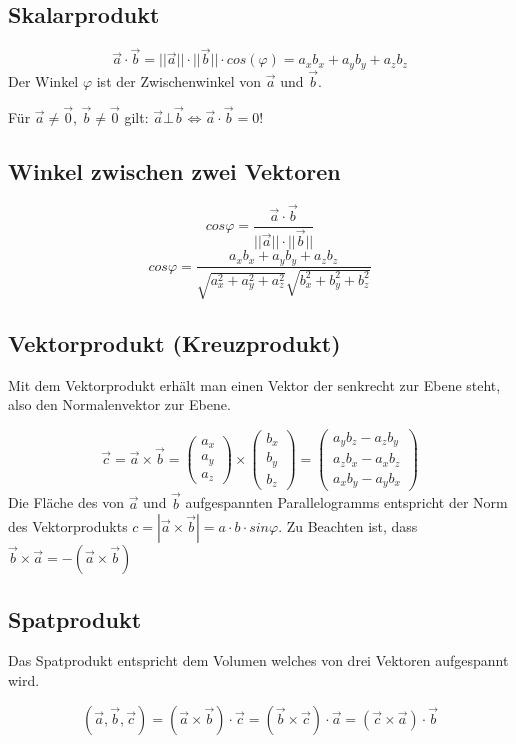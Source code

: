 \subsection{Skalarprodukt}
\[ \boxed{ \vec{a} \cdot \vec{b} = ||\vec{a}|| \cdot ||\vec{b}|| 
\cdot cos(\varphi) = a_x b_x + a_y b_y + a_z b_z } \]
Der Winkel $\varphi$ ist der Zwischenwinkel von $\vec{a}$ und $\vec{b}$.

\noindent
Für $\vec{a} \neq \vec{0}$, $\vec{b} \neq \vec{0}$ gilt: $\vec{a} \bot \vec{b} 
\Leftrightarrow \vec{a} \cdot \vec{b} = 0$!

\subsection{Winkel zwischen zwei Vektoren}
\[ \boxed{ cos \varphi = \frac{\vec{a} \cdot \vec{b} }
{||\vec{a}|| \cdot ||\vec{b}||} } \]
\[ \boxed{ cos \varphi = \frac{a_x b_x + a_y b_y + a_z b_z}
{ \sqrt{a_x^2 + a_y^2 + a_z^2} \sqrt{b_x^2 + b_y^2 + b_z^2} } } \]

\subsection{Vektorprodukt (Kreuzprodukt)}
Mit dem Vektorprodukt erhält man einen Vektor der senkrecht zur Ebene steht, 
also den Normalenvektor zur Ebene.

\[ \boxed{ \vec{c} = \vec{a} \times \vec{b} = 
\left( 
	  \begin{array}{ccc} 
	    a_x \\ a_y \\ a_z
	  \end{array}
	\right)
	\times
	\left( 
	  \begin{array}{ccc} 
	    b_x \\ b_y \\ b_z
	  \end{array}
	\right)
	=
	\left( 
	  \begin{array}{ccc} 
	    a_y b_z - a_z b_y \\ a_z b_x - a_x b_z \\ a_x b_y - a_y b_x
	  \end{array}
	\right)
} \]
\noindent
Die Fläche des von $\vec{a}$ und $\vec{b}$ aufgespannten Parallelogramms 
entspricht der Norm des Vektorprodukts $c=|\vec{a}\times\vec{b}| 
= a \cdot b \cdot sin \varphi$.
Zu Beachten ist, dass $\vec{b} \times \vec{a} = -(\vec{a} \times \vec{b}) $

\subsection{Spatprodukt}
Das Spatprodukt entspricht dem Volumen welches von drei Vektoren aufgespannt 
wird.

\[ \boxed{ (\vec{a},\vec{b},\vec{c}) = (\vec{a} \times \vec{b}) \cdot \vec{c} 
= (\vec{b} \times \vec{c}) \cdot \vec{a} 
= (\vec{c} \times \vec{a}) \cdot \vec{b} } \]
